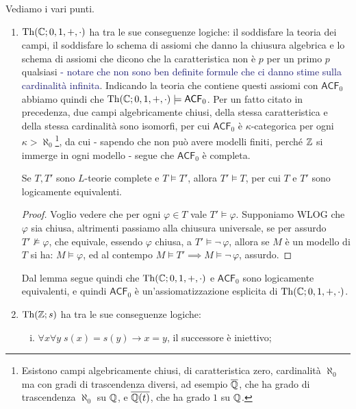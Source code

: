\begin{soln}
    Vediamo i vari punti.
    \begin{enumerate}
        \item $\operatorname{Th}(\mathbb C;0,1,+,\cdot)$ ha tra le sue conseguenze logiche: il soddisfare la teoria dei campi, il soddisfare lo schema di assiomi che danno la chiusura algebrica e lo
        schema di assiomi che dicono che la caratteristica non è $p$ per un primo $p$ qualsiasi \textcolor{MidnightBlue}{- notare che non sono ben definite formule che ci danno stime sulla cardinalità infinita}.
        Indicando la teoria che contiene questi assiomi con $\mathsf{ACF}_0$ abbiamo quindi che $\operatorname{Th}(\mathbb C;0,1,+,\cdot) \models \mathsf{ACF}_0$. Per un fatto citato in precedenza, due campi algebricamente chiusi, della stessa caratteristica
        e della stessa cardinalità sono isomorfi, per cui $\mathsf{ACF}_0$ è $\kappa$-categorica per ogni $\kappa > \aleph_0$\footnote{Esistono campi algebricamente chiusi, di caratteristica zero, cardinalità $\aleph_0$ ma con gradi di trascendenza diversi,
        ad esempio $\overline{\mathbb Q}$, che ha grado di trascendenza $\aleph_0$ su $\mathbb Q$, e $\overline{\mathbb Q(t)}$, che ha grado $1$ su $\mathbb Q$.}, da cui - sapendo che non può avere modelli finiti, perché $\mathbb Z$ si immerge in ogni modello - segue che $\mathsf{ACF}_0$ è completa.
        \begin{lemma}
            Se $T,T'$ sono $L$-teorie complete e $T \models T'$, allora $T'\models T$, per cui $T$ e $T'$ sono logicamente equivalenti.
        \end{lemma}
        \begin{proof}
            Voglio vedere che per ogni $\varphi \in T$ vale $T' \models \varphi$. Supponiamo WLOG che $\varphi$ sia chiusa, altrimenti passiamo alla chiusura universale, se per assurdo $T' \not\models \varphi$,
            che equivale, essendo $\varphi$ chiusa, a $T' \models \neg\, \varphi$, allora se $M$ è un modello di $T$ si ha: $M \models \varphi$, ed al contempo $M \models T' \implies M \models \neg\, \varphi$, assurdo.
        \end{proof}
        Dal lemma segue quindi che $\operatorname{Th}(\mathbb C;0,1,+,\cdot)$ e $\mathsf{ACF}_0$ sono logicamente equivalenti, e quindi $\mathsf{ACF}_0$ è un'assiomatizzazione esplicita di $\operatorname{Th}(\mathbb C;0,1,+,\cdot)$.
        \item $\operatorname{Th}(\mathbb Z;s)$ ha tra le sue conseguenze logiche:
        \begin{enumerate}[(i)]
            \item $\forall x \forall y \; s(x) = s(y) \to x = y$, il successore è iniettivo;

\end{enumerate}
\end{enumerate}
\end{soln}
